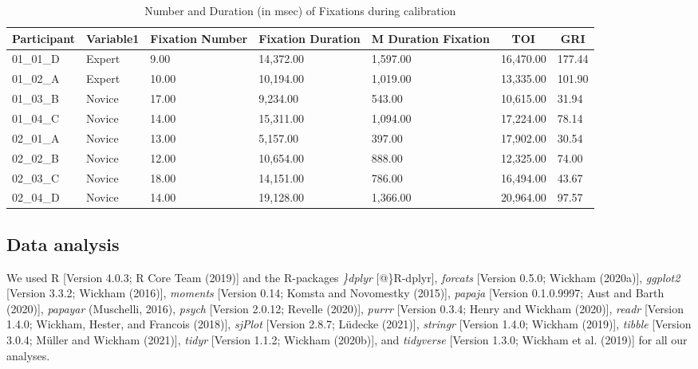 \documentclass[
  english,
  man,floatsintext]{apa6}
\begin{document}
\begin{table}[h]

\begin{center}
\begin{threeparttable}

\caption{\label{tab:calibration phase TOI}Number and Duration (in msec) of Fixations during calibration}

\scriptsize{

\begin{tabular}{lllllll}
\toprule
Participant & \multicolumn{1}{c}{Variable1} & \multicolumn{1}{c}{Fixation Number} & \multicolumn{1}{c}{Fixation Duration} & \multicolumn{1}{c}{M Duration Fixation} & \multicolumn{1}{c}{TOI} & \multicolumn{1}{c}{GRI}\\
\midrule
01\_01\_D & Expert & 9.00 & 14,372.00 & 1,597.00 & 16,470.00 & 177.44\\
01\_02\_A & Expert & 10.00 & 10,194.00 & 1,019.00 & 13,335.00 & 101.90\\
01\_03\_B & Novice & 17.00 & 9,234.00 & 543.00 & 10,615.00 & 31.94\\
01\_04\_C & Novice & 14.00 & 15,311.00 & 1,094.00 & 17,224.00 & 78.14\\
02\_01\_A & Novice & 13.00 & 5,157.00 & 397.00 & 17,902.00 & 30.54\\
02\_02\_B & Novice & 12.00 & 10,654.00 & 888.00 & 12,325.00 & 74.00\\
02\_03\_C & Novice & 18.00 & 14,151.00 & 786.00 & 16,494.00 & 43.67\\
02\_04\_D & Novice & 14.00 & 19,128.00 & 1,366.00 & 20,964.00 & 97.57\\
\bottomrule
\end{tabular}

}

\end{threeparttable}
\end{center}

\end{table}

\hypertarget{data-analysis}{%
\subsection{Data analysis}\label{data-analysis}}

We used R {[}Version 4.0.3; R Core Team (2019){]} and the R-packages \emph{\}dplyr} {[}@\}R-dplyr{]}, \emph{forcats} {[}Version 0.5.0; Wickham (2020a){]}, \emph{ggplot2} {[}Version 3.3.2; Wickham (2016){]}, \emph{moments} {[}Version 0.14; Komsta and Novomestky (2015){]}, \emph{papaja} {[}Version 0.1.0.9997; Aust and Barth (2020){]}, \emph{papayar} (Muschelli, 2016), \emph{psych} {[}Version 2.0.12; Revelle (2020){]}, \emph{purrr} {[}Version 0.3.4; Henry and Wickham (2020){]}, \emph{readr} {[}Version 1.4.0; Wickham, Hester, and Francois (2018){]}, \emph{sjPlot} {[}Version 2.8.7; Lüdecke (2021){]}, \emph{stringr} {[}Version 1.4.0; Wickham (2019){]}, \emph{tibble} {[}Version 3.0.4; Müller and Wickham (2021){]}, \emph{tidyr} {[}Version 1.1.2; Wickham (2020b){]}, and \emph{tidyverse} {[}Version 1.3.0; Wickham et al. (2019){]} for all our analyses.
\end{document}
